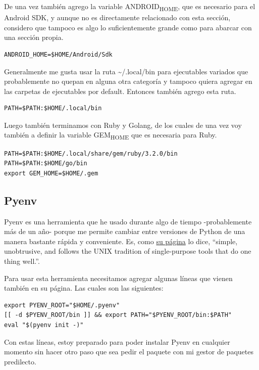 \documentclass[11pt]{article}
\begin{document}
De una vez también agrego la variable ANDROID\textsubscript{HOME}, que es necesario para el Android SDK, y aunque no es directamente relacionado con esta sección, considero que tampoco es algo lo suficientemente grande como para abarcar con una sección propia.

\begin{verbatim}
ANDROID_HOME=$HOME/Android/Sdk
\end{verbatim}

Generalmente me gusta usar la ruta \textasciitilde{}/.local/bin para ejecutables variados que probablemente no quepan en alguna otra categoría y tampoco quiera agregar en las carpetas de ejecutables por default. Entonces también agrego esta ruta.

\begin{verbatim}
PATH=$PATH:$HOME/.local/bin
\end{verbatim}

Luego también terminamos con Ruby y Golang, de los cuales de una vez voy también a definir la variable GEM\textsubscript{HOME} que es necesaria para Ruby.

\begin{verbatim}
PATH=$PATH:$HOME/.local/share/gem/ruby/3.2.0/bin
PATH=$PATH:$HOME/go/bin
export GEM_HOME=$HOME/.gem

\end{verbatim}
\subsection{Pyenv}
\label{sec:orgf870250}

Pyenv es una herramienta que he usado durante algo de tiempo -probablemente más de un año- porque me permite cambiar entre versiones de Python de una manera bastante rápida y conveniente. Es, como \href{https://github.com/pyenv/pyenv}{su página} lo dice, ``simple, unobtrusive, and follows the UNIX tradition of single-purpose tools that do one thing well.''.

Para usar esta herramienta necesitamos agregar algunas líneas que vienen también en su página. Las cuales son las siguientes:

\begin{verbatim}
export PYENV_ROOT="$HOME/.pyenv"
[[ -d $PYENV_ROOT/bin ]] && export PATH="$PYENV_ROOT/bin:$PATH"
eval "$(pyenv init -)"
\end{verbatim}

Con estas líneas, estoy preparado para poder instalar Pyenv en cualquier momento sin hacer otro paso que sea pedir el paquete con mi gestor de paquetes predilecto.
\end{document}
